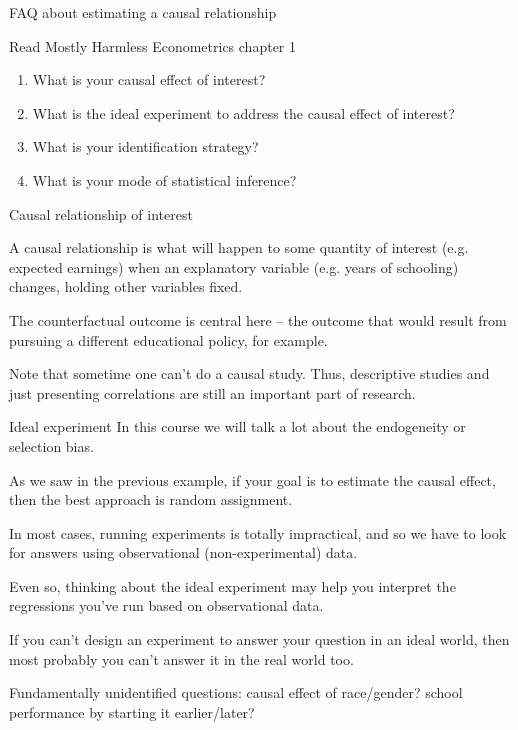\documentclass[handout]{beamer}
\begin{document}
\begin{frame}{FAQ about estimating a causal relationship}

Read Mostly Harmless Econometrics  chapter 1

\begin{enumerate}
	\item What is your causal effect of interest?
	\item What is the ideal experiment to address the causal effect of interest?
	\item What is your identification strategy?
	\item What is your mode of statistical inference?
\end{enumerate}
\end{frame}



\begin{frame}{Causal relationship of interest}

A causal relationship is what will happen to some quantity of interest (e.g. expected earnings) when an explanatory variable (e.g. years of schooling) changes, holding other variables fixed. \bigskip


The counterfactual outcome is central here -- the outcome that would result from pursuing a different educational policy, for example.\bigskip

Note that sometime one can't do a causal study. Thus, descriptive studies and just presenting correlations are still an important part of research.

\end{frame}

\begin{frame}{Ideal experiment}
In this course we will talk a lot about the endogeneity or selection bias.\bigskip

As we saw in the previous example, if your goal is to estimate the causal effect, then the best approach is random assignment.\bigskip

In most cases, running experiments is totally impractical, and so we have to look for answers using observational (non-experimental) data. \bigskip

Even so, thinking about the ideal experiment may help you interpret the regressions you've run based on observational data.\bigskip

If you can't design an experiment to answer your question in an ideal world, then most probably you can't answer it in the real world too.\bigskip

Fundamentally unidentified questions: causal effect of race/gender? school performance by starting it earlier/later?


\end{frame}
\end{document}
